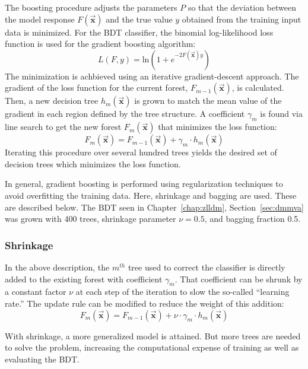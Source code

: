 The boosting procedure adjusts the parameters $P$ so that the deviation between the model response
$F(\vec{\mathbf{x}})$ and the true value $y$ obtained from the training input data is minimized.
For the BDT classifier, the binomial log-likelihood loss function is used for the gradient boosting algorithm:
\begin{equation}
L(F,y) = \mathrm{ln}\left(1+e^{-2F(\vec{\mathbf{x}}) y}\right)
\end{equation}
The minimization is achbieved using an iterative gradient-descent approach.
The gradient of the loss function for the current forest, $F_{m-1}(\vec{\mathbf{x}})$, is calculated.
Then, a new decision tree $h_m(\vec{\mathbf{x}})$ is grown to match
the mean value of the gradient in each region defined by the tree structure.
A coefficient $\gamma_m$ is found via line search to get the new forest $F_m(\vec{\mathbf{x}})$
that minimizes the loss function:
\begin{equation}
F_m(\vec{\mathbf{x}}) = F_{m-1}(\vec{\mathbf{x}}) + \gamma_m \cdot h_m(\vec{\mathbf{x}})
\end{equation}
Iterating this procedure over several hundred trees yields the desired set of
decision trees which minimizes the loss function.

In general, gradient boosting is performed using regularization techniques 
to avoid overfitting the training data. Here, shrinkage and bagging are used.
These are described below.
The BDT seen in Chapter~\ref{chap:zlldm}, Section~\ref{sec:dmmva}
was grown with 400 trees, shrinkage parameter $\nu=0.5$, and bagging fraction 0.5.

\subsubsection{Shrinkage}
In the above description, the $m^{th}$ tree used to correct the classifier is directly added to the existing forest with coefficient $\gamma_m$.
That coefficient can be shrunk by a constant factor $\nu$ at each step of the iteration to slow the so-called ``learning rate.''
The update rule can be modified to reduce the weight of this addition:
\begin{equation}
F_m(\vec{\mathbf{x}}) = F_{m-1}(\vec{\mathbf{x}}) + \nu \cdot \gamma_m \cdot h_m(\vec{\mathbf{x}})
\end{equation}

With shrinkage, a more generalized model is attained.
But more trees are needed to solve the problem,
increasing the computational expense of training as well as evaluating the BDT.

